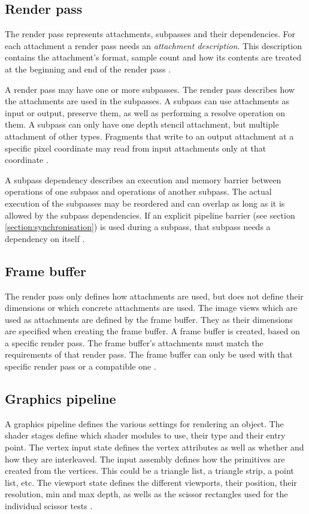 \subsection{Render pass}
\label{section:renderpass}


The render pass represents attachments, subpasses and their dependencies. For each attachment a render pass needs an \textit{attachment description}. This description contains the attachment's format, sample count and how its contents are treated at the beginning and end of the render pass \cite{khronos:vulkan:spec1.1}.

A render pass may have one or more subpasses. The render pass describes how the attachments are used in the subpasses. A subpass can use attachments as input or output, preserve them, as well as performing a resolve operation on them. A subpass can only have one depth stencil attachment, but multiple attachment of other types. Fragments that write to an output attachment at a specific pixel coordinate may read from input attachments only at that coordinate \cite{khronos:vulkan:spec1.1}.

A subpass dependency describes an execution and memory barrier between operations of one subpass and operations of another subpass. The actual execution of the subpasses may be reordered and can overlap as long as it is allowed by the subpass dependencies. If an explicit pipeline barrier (see section \ref{section:synchronisation}) is used during a subpass, that subpass needs a dependency on itself \cite{khronos:vulkan:spec1.1}.

\subsection{Frame buffer}
The render pass only defines how attachments are used, but does not define their dimensions or which concrete attachments are used. The image views which are used as attachments are defined by the frame buffer. They as their dimensions are specified when creating the frame buffer. A frame buffer is created, based on a specific render pass. The frame buffer's attachments must match the requirements of that render pass. The frame buffer can only be used with that specific render pass or a compatible one \cite{khronos:vulkan:spec1.1}.


\subsection{Graphics pipeline}
A graphics pipeline defines the various settings for rendering an object. The shader stages define which shader modules to use, their type and their entry point. The vertex input state defines the vertex attributes as well as whether and how they are interleaved. The input assembly defines how the primitives are created from the vertices. This could be a triangle list, a triangle strip, a point list, etc. The viewport state defines the different viewports, their position, their resolution, min and max depth, as wells as the scissor rectangles used for the individual scissor tests \cite{khronos:vulkan:spec1.1}.

